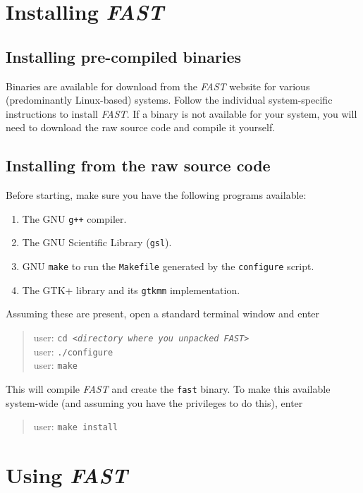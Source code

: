 \documentclass[a4paper,12pt]{report}
\newcommand{\fast}{\emph{FAST} }
\begin{document}
\chapter{Installing \fast}
\section{Installing pre-compiled binaries}
Binaries are available for download from the \fast website for various (predominantly Linux-based) systems. Follow the individual system-specific instructions to install \emph{FAST}. If a binary is not available for your system, you will need to download the raw source code and compile it yourself.
\section{Installing from the raw source code}
\label{section:inst:code}
Before starting, make sure you have the following programs available:

\begin{enumerate}
\item The GNU \verb|g++| compiler. 
\item The GNU Scientific Library (\verb|gsl|). 
\item GNU \verb|make| to run the \verb|Makefile| generated by the \verb|configure| script.
\item The GTK+ library and its \verb|gtkmm| implementation.
\end{enumerate}
Assuming these are present, open a standard terminal window and enter
\begin{quote}
  user\@@host: \texttt{cd \emph{<directory where you unpacked FAST>}}\\
  user\@@host: \verb|./configure|\\
  user\@@host: \verb|make|
\end{quote}
This will compile \fast and create the \verb|fast| binary. To make this available system-wide (and assuming you have the privileges to do this), enter
\begin{quote}
  user\@@host: \verb|make install|
\end{quote}


\chapter{Using \fast}
\end{document}
